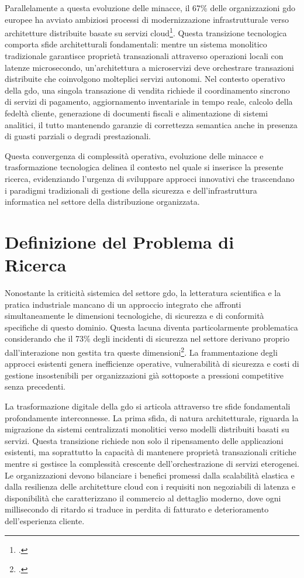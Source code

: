 Parallelamente a questa evoluzione delle minacce, il 67\% delle organizzazioni \gls{gdo} europee ha avviato ambiziosi processi di modernizzazione infrastrutturale verso architetture distribuite basate su servizi cloud\footcite{gartner2024cloud}. Questa transizione tecnologica comporta sfide architetturali fondamentali: mentre un sistema monolitico tradizionale garantisce proprietà transazionali attraverso operazioni locali con latenze microsecondo, un'architettura a microservizi deve orchestrare transazioni distribuite che coinvolgono molteplici servizi autonomi. Nel contesto operativo della \gls{gdo}, una singola transazione di vendita richiede il coordinamento sincrono di servizi di pagamento, aggiornamento inventariale in tempo reale, calcolo della fedeltà cliente, generazione di documenti fiscali e alimentazione di sistemi analitici, il tutto mantenendo garanzie di correttezza semantica anche in presenza di guasti parziali o degradi prestazionali.

Questa convergenza di complessità operativa, evoluzione delle minacce e trasformazione tecnologica delinea il contesto nel quale si inserisce la presente ricerca, evidenziando l'urgenza di sviluppare approcci innovativi che trascendano i paradigmi tradizionali di gestione della sicurezza e dell'infrastruttura informatica nel settore della distribuzione organizzata.

\section{\texorpdfstring{Definizione del Problema di Ricerca}{1.2 - Definizione del Problema di Ricerca}}
\label{sec:problema_ricerca}

Nonostante la criticità sistemica del settore \gls{gdo}, la letteratura scientifica e la pratica industriale mancano di un approccio integrato che affronti simultaneamente le dimensioni tecnologiche, di sicurezza e di conformità specifiche di questo dominio. Questa lacuna diventa particolarmente problematica considerando che il 73\% degli incidenti di sicurezza nel settore derivano proprio dall'interazione non gestita tra queste dimensioni\footcite{ponemon2024retail}. La frammentazione degli approcci esistenti genera inefficienze operative, vulnerabilità di sicurezza e costi di gestione insostenibili per organizzazioni già sottoposte a pressioni competitive senza precedenti.

La trasformazione digitale della \gls{gdo} si articola attraverso tre sfide fondamentali profondamente interconnesse. La prima sfida, di natura architetturale, riguarda la migrazione da sistemi centralizzati monolitici verso modelli distribuiti basati su servizi. Questa transizione richiede non solo il ripensamento delle applicazioni esistenti, ma soprattutto la capacità di mantenere proprietà transazionali critiche mentre si gestisce la complessità crescente dell'orchestrazione di servizi eterogenei. Le organizzazioni devono bilanciare i benefici promessi dalla scalabilità elastica e dalla resilienza delle architetture cloud con i requisiti non negoziabili di latenza e disponibilità che caratterizzano il commercio al dettaglio moderno, dove ogni millisecondo di ritardo si traduce in perdita di fatturato e deterioramento dell'esperienza cliente.

